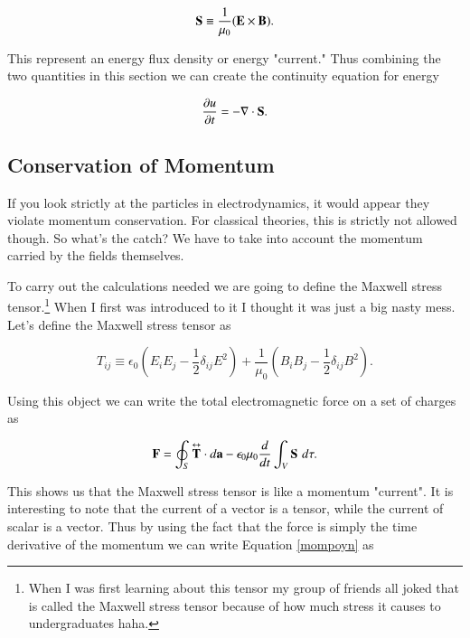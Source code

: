 \documentclass[preprint, review,12pt]{elsarticle}
\def\x{\times}
\def\.{\cdot}
\def\b{\textbf}
\def\={\equiv}
\def\div{\nabla \.}
\def\9{\left(}
\def\0{\right)}
\newcommand{\pd}[2]{\frac{\partial #1 }{\partial #2}}
\newcommand{\td}[2]{\frac{d #1 }{d #2}}
\newcommand{\tup}[1]{\overset{\text{\tiny $\bm\leftrightarrow $}}{\b #1}}
\begin{document}
\begin{equation}
    \b S \= \frac{1}{\mu_0} (\b E \x \b B).
\end{equation}

This represent an energy flux density or energy "current." Thus combining the two quantities in this section we can create the continuity equation for energy

\begin{equation}
    \pd{u}{t} = - \div \b S.    
\end{equation}

\subsection{Conservation of Momentum}

If you look strictly at the particles in electrodynamics, it would appear they violate momentum conservation. For classical theories, this is strictly not allowed though. So what's the catch? We have to take into account the momentum carried by the fields themselves. 

To carry out the calculations needed we are going to define the Maxwell stress tensor.\footnote{When I was first learning about this tensor my group of friends all joked that is called the Maxwell stress tensor because of how much stress it causes to undergraduates haha.} When I first was introduced to it I thought it was just a big nasty mess. Let's define the Maxwell stress tensor as

\begin{equation}
    T_{ij} \= \epsilon_0 \9 E_iE_j - \frac{1}{2}\delta_{ij}E^2 \0 + \frac{1}{\mu_0} \9 B_iB_j - \frac{1}{2}\delta_{ij}B^2 \0 .
\end{equation}

Using this object we can write the total electromagnetic force on a set of charges as 

\begin{equation}
\label{mompoyn}
    \b F = \oint_S \tup{T} \. d\b a - \epsilon_0 \mu_0 \td{}{t} \int_V \b S \hspace{3.5pt} d\tau.
\end{equation}

This shows us that the Maxwell stress tensor is like a momentum "current". It is interesting to note that the current of a vector is a tensor, while the current of scalar is a vector. Thus by using the fact that the force is simply the time derivative of the momentum we can write Equation \ref{mompoyn} as 
\end{document}
